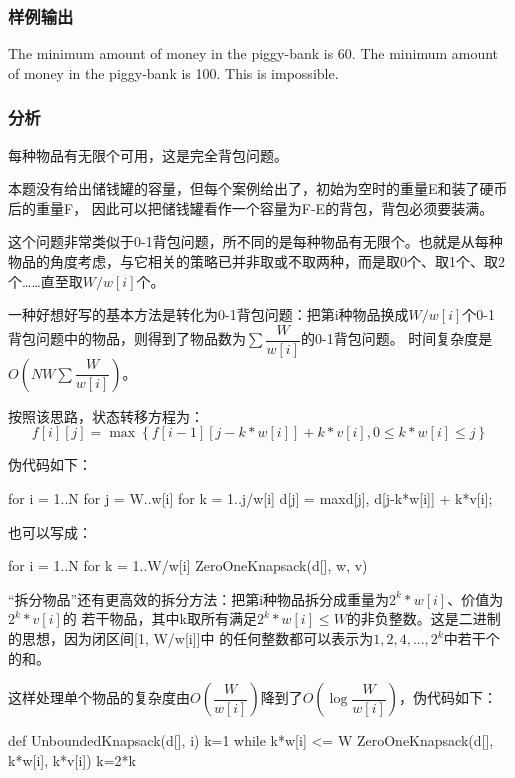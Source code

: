 \subsubsection{样例输出}
\begin{Code}
The minimum amount of money in the piggy-bank is 60.
The minimum amount of money in the piggy-bank is 100.
This is impossible.
\end{Code}

\subsubsection{分析}
每种物品有无限个可用，这是完全背包问题。

本题没有给出储钱罐的容量，但每个案例给出了，初始为空时的重量E和装了硬币后的重量F，
因此可以把储钱罐看作一个容量为F-E的背包，背包必须要装满。

这个问题非常类似于0-1背包问题，所不同的是每种物品有无限个。也就是从每种
物品的角度考虑，与它相关的策略已并非取或不取两种，而是取0个、取1个、取2
个……直至取$W/w[i]$个。

一种好想好写的基本方法是转化为0-1背包问题：把第i种物品换成$W/w[i]$个0-1
背包问题中的物品，则得到了物品数为$\sum \dfrac{W}{w[i]}$的0-1背包问题。
时间复杂度是$O(NW\sum \dfrac{W}{w[i]})$。

按照该思路，状态转移方程为：
$$f[i][j]=\max\left\{f[i-1][j-k*w[i]]+k*v[i], 0 \leq k*w[i] \leq j\right\}$$

伪代码如下：
\begin{Code}
for i = 1..N
    for j = W..w[i]
        for k = 1..j/w[i]
            d[j] = max{d[j], d[j-k*w[i]] + k*v[i]};
\end{Code}

也可以写成：
\begin{Code}
for i = 1..N
    for k = 1..W/w[i]
        ZeroOneKnapsack(d[], w, v)
\end{Code}

“拆分物品”还有更高效的拆分方法：把第i种物品拆分成重量为$2^k*w[i]$、价值为$2^k*v[i]$的
若干物品，其中k取所有满足$2^k*w[i] \leq W$的非负整数。这是二进制的思想，因为闭区间[1, W/w[i]]中
的任何整数都可以表示为$1, 2, 4, ..., 2^k$中若干个的和。

这样处理单个物品的复杂度由$O\left(\dfrac{W}{w[i]}\right)$降到了$O\left(\log \dfrac{W}{w[i]}\right)$，伪代码如下：
\begin{Code}
def UnboundedKnapsack(d[], i)
    k=1
    while k*w[i] <= W
        ZeroOneKnapsack(d[], k*w[i], k*v[i])
        k=2*k
\end{Code}

